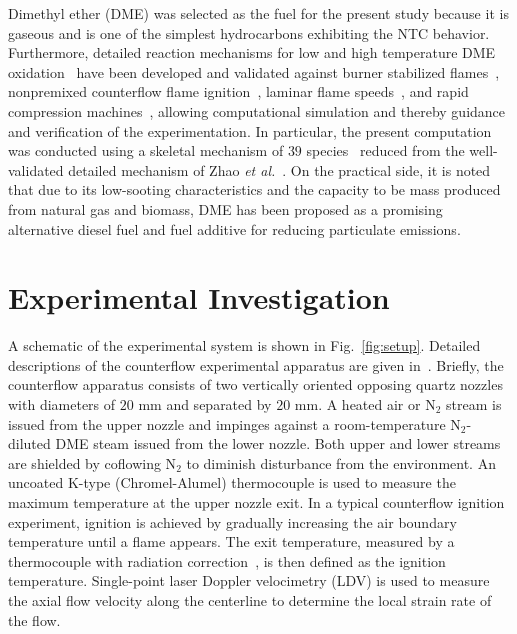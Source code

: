 \documentclass[review,3p,times]{elsarticleUS}
\begin{document}
Dimethyl ether (DME) was selected as the fuel for the present study because it is gaseous and is one of the simplest hydrocarbons exhibiting the NTC behavior. Furthermore, detailed reaction mechanisms for low and high temperature DME oxidation~\cite{curran98,fischer00,curran00,zhao08} have been developed and validated against burner stabilized flames~\cite{kaiser00}, nonpremixed counterflow flame ignition~\cite{zheng05}, laminar flame speeds~\cite{qin05}, and rapid compression machines~\cite{mittal08}, allowing computational simulation and thereby guidance and verification of the experimentation. In particular, the present computation was conducted using a skeletal mechanism of $39$ species~\cite{bansal11} reduced from the well-validated detailed mechanism of Zhao \emph{et al.}~\cite{zhao08}. On the practical side, it is noted that due to its low-sooting characteristics and the capacity to be mass produced from natural gas and biomass, DME has been proposed as a promising alternative diesel fuel and fuel additive for reducing particulate emissions.

\section{Experimental Investigation}

A schematic of the experimental system is shown in Fig.~\ref{fig:setup}. Detailed descriptions of the counterflow experimental apparatus are given in~\cite{fotache95,liu10a}. Briefly, the counterflow apparatus consists of two vertically oriented opposing quartz nozzles with diameters of $20$ mm and separated by $20$ mm. A heated air or N$_2$ stream is issued from the upper nozzle and impinges against a room-temperature N$_2$-diluted DME steam issued from the lower nozzle. Both upper and lower streams are shielded by coflowing N$_2$ to diminish disturbance from the environment. An uncoated K-type (Chromel-Alumel) thermocouple is used to measure the maximum temperature at the upper nozzle exit. In a typical counterflow ignition experiment, ignition is achieved by gradually increasing the air boundary temperature until a flame appears. The exit temperature, measured by a thermocouple with radiation correction~\cite{zheng06}, is then defined as the ignition temperature. Single-point laser Doppler velocimetry (LDV) is used to measure the axial flow velocity along the centerline to determine the local strain rate of the flow.
\end{document}
